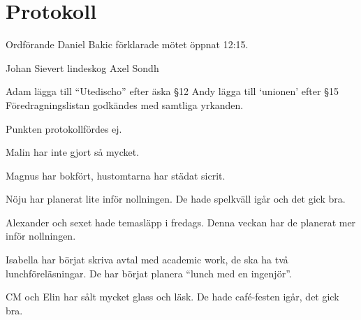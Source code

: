 \documentclass[10pt]{article}
\def\mo{Daniel Bakic}
\begin{document}
\section*{Protokoll}
\begin{paragrafer}
    Ordförande {\mo} förklarade mötet öppnat 12:15.

    {\valavmo}

    {\valavms}

    {\valavj}

    {\tosg}

    {\ingaadj}
    Johan Sievert lindeskog
    Axel Sondh


    Adam \ypa lägga till ``Utedischo'' efter äska \S12
    Andy \ypa lägga till `unionen' efter \S15
    Föredragningslistan godkändes med samtliga yrkanden.

    \ingaprot

    \begin{fyllnadsval} %
    \end{fyllnadsval}

    \begin{paragrafer}
        Punkten protokollfördes ej.

         Malin har inte gjort så mycket.
    
        Magnus har bokfört, hustomtarna har städat sicrit.

        Nöju har planerat lite inför nollningen. De hade spelkväll igår och det gick bra. 

        Alexander och sexet hade temasläpp i fredags. Denna veckan har de planerat mer inför nollningen.

        Isabella har börjat skriva avtal med academic work, de ska ha två lunchföreläsningar. De har börjat planera ``lunch med en ingenjör''.

        CM och Elin har sålt mycket glass och läsk. De hade café-festen igår, det gick bra.


\end{paragrafer}
\end{paragrafer}
\end{document}
